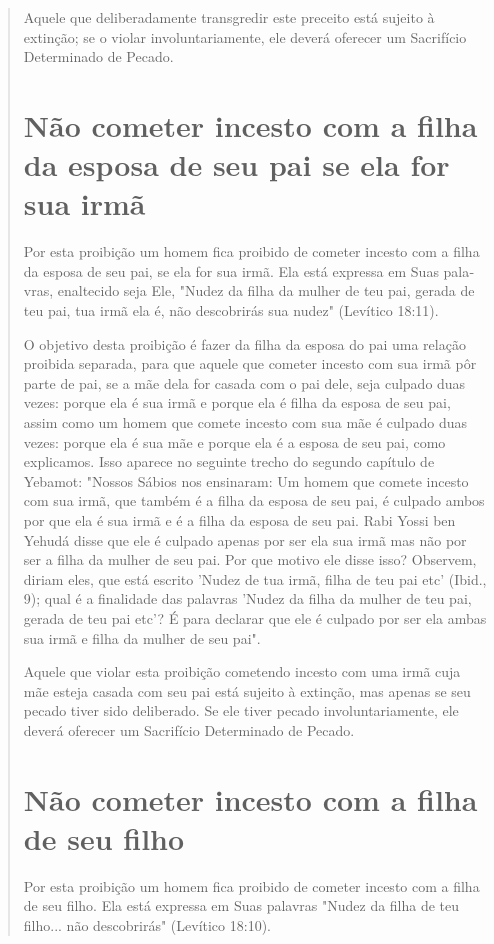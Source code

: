 \begin{quote}
Aquele que deliberadamente transgredir este preceito está sujeito à
extinção; se o violar involuntariamente, ele deverá oferecer um
Sacrifício De­terminado de Pecado.

\section{Não cometer incesto com a filha da esposa de seu pai se ela for sua irmã}

Por esta proibição um homem fica proibido de cometer incesto com a filha
da esposa de seu pai, se ela for sua irmã. Ela está expressa em Suas
pala­vras, enaltecido seja Ele, "Nudez da filha da mulher de teu pai,
gerada de teu pai, tua irmã ela é, não descobrirás sua nudez" (Levítico
18:11).

O objetivo desta proibição é fazer da filha da esposa do pai uma
re­lação proibida separada, para que aquele que cometer incesto com sua
irmã pôr parte de pai, se a mãe dela for casada com o pai dele, seja
culpado duas vezes: porque ela é sua irmã e porque ela é filha da esposa
de seu pai, assim como um homem que comete incesto com sua mãe é culpado
duas vezes: porque ela é sua mãe e porque ela é a esposa de seu pai,
como explicamos. Isso aparece no seguinte trecho do segundo capítulo de
Yebamot: "Nossos Sábios nos ensi­naram: Um homem que comete incesto com
sua irmã, que também é a filha da esposa de seu pai, é culpado ambos por
que ela é sua irmã e é a filha da esposa de seu pai. Rabi Yossi ben
Yehudá disse que ele é culpado apenas por ser ela sua irmã mas não por
ser a filha da mulher de seu pai. Por que motivo ele disse isso?
Observem, diriam eles, que está escrito 'Nudez de tua irmã, filha de teu
pai etc' (Ibid., 9); qual é a finalidade das palavras 'Nudez da filha da
mu­lher de teu pai, gerada de teu pai etc'? É para declarar que ele é
culpado por ser ela ambas sua irmã e filha da mulher de seu pai".

Aquele que violar esta proibição cometendo incesto com uma irmã cuja mãe
esteja casada com seu pai está sujeito à extinção, mas apenas se seu
pecado tiver sido deliberado. Se ele tiver pecado involuntariamente, ele
deve­rá oferecer um Sacrifício Determinado de Pecado.

\section{Não cometer incesto com a filha de seu filho}

Por esta proibição um homem fica proibido de cometer incesto com a filha
de seu filho. Ela está expressa em Suas palavras "Nudez da filha de teu
filho... não descobrirás" (Levítico 18:10).



\end{quote}
